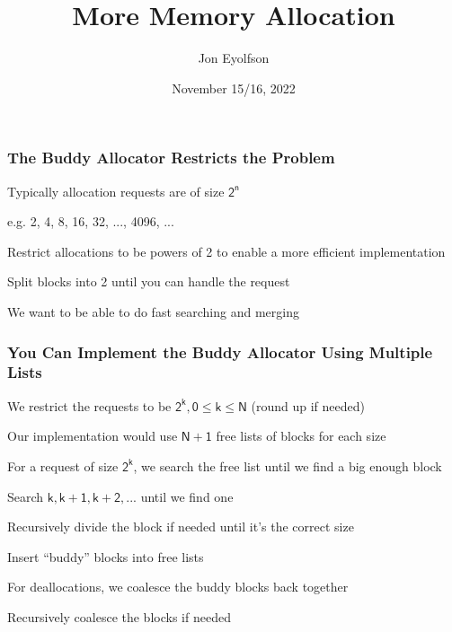 

\title{More Memory Allocation}
\author{Jon Eyolfson}
\date{November 15/16, 2022}


  \begin{frame}
    \titlepage
  \end{frame}

  \begin{frame}
    \frametitle{The Buddy Allocator Restricts the Problem}

    Typically allocation requests are of size $\mathsf{2^n}$

    \hspace{2em} e.g. 2, 4, 8, 16, 32, ..., 4096, ...

    \vspace{2em}

    Restrict allocations to be powers of 2 to enable a more efficient
    implementation

    \hspace{2em} Split blocks into 2 until you can handle the request

    \vspace{2em}

    We want to be able to do fast searching and merging
  \end{frame}

  \begin{frame}
    \frametitle{You Can Implement the Buddy Allocator Using Multiple Lists}
    

    We restrict the requests to be $\mathsf{2^k, 0 \leq k \leq N}$ (round up if
    needed)

    \vspace{2em}

    Our implementation would use $\mathsf{N+1}$ free lists of blocks for each
    size

    \hspace{2em}

    For a request of size $\mathsf{2^k}$, we search the free list until we find
    a big enough block

    \hspace{2em} Search $\mathsf{k, k+1, k+2, ...}$ until we find one

    \hspace{4em} Recursively divide the block if needed until it's the correct
                 size

    \hspace{6em} Insert “buddy” blocks into free lists

    \vspace{2em}

    For deallocations, we coalesce the buddy blocks back together

    \hspace{2em} Recursively coalesce the blocks if needed
  \end{frame}

